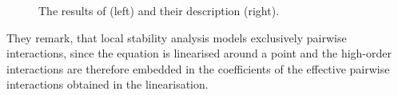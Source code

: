 \documentclass[a4paper,12pt]{article}
\theoremstyle{definition}
\theoremstyle{remark}
\begin{document}
\begin{itemize}
    \begin{figure}[h!]
	\begin{center}
        \caption{The results of \cite{Bairey2016} (left) and their description (right).} 
    	\label{Bairey_res}
    \end{center}
    \end{figure}
    

They remark, that local stability analysis models exclusively pairwise interactions, since the equation is linearised around a point and the high-order interactions are therefore embedded in the coefficients of the effective pairwise interactions obtained in the linearisation.


\end{itemize}
\end{document}
